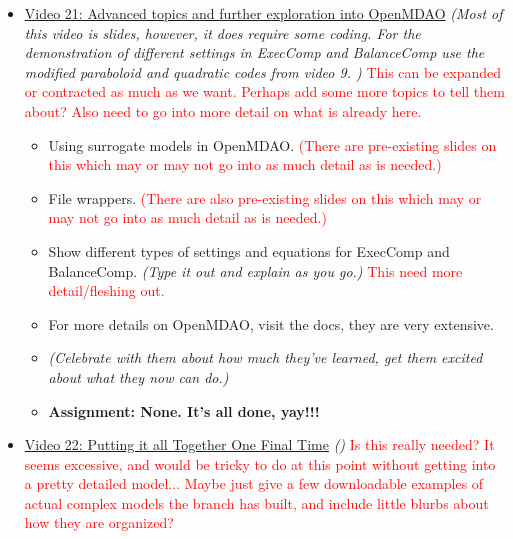 \documentclass[12pt, letterpaper]{article}
\begin{document}
\begin{itemize}
	\item \underline{Video 21: Advanced topics and further exploration into OpenMDAO} \textit{(Most of this video is slides, however, it does require some coding. For the demonstration of different settings in ExecComp and BalanceComp use the modified paraboloid and quadratic codes from video 9. )} \textcolor{red}{This can be expanded or contracted as much as we want. Perhaps add some more topics to tell them about? Also need to go into more detail on what is already here.}
		\begin{itemize}
			\item Using surrogate models in OpenMDAO. \textcolor{red}{(There are pre-existing slides on this which may or may not go into as much detail as is needed.)}
			\item File wrappers. \textcolor{red}{(There are also pre-existing slides on this which may or may not go into as much detail as is needed.)}
			\item Show different types of settings and equations for ExecComp and BalanceComp. \textit{(Type it out and explain as you go.)} \textcolor{red}{This need more detail/fleshing out.}
			\item For more details on OpenMDAO, visit the docs, they are very extensive.
			\item \textit{(Celebrate with them about how much they’ve learned, get them excited about what they now can do.)}
			\item \textbf{Assignment: None. It's all done, yay!!!}
		\end{itemize}
		
	\item \underline{Video 22: Putting it all Together One Final Time} \textit{()} \textcolor{red}{Is this really needed? It seems excessive, and would be tricky to do at this point without getting into a pretty detailed model... Maybe just give a few downloadable examples of actual complex models the branch has built, and include little blurbs about how they are organized?}

\end{itemize}
\end{document}
